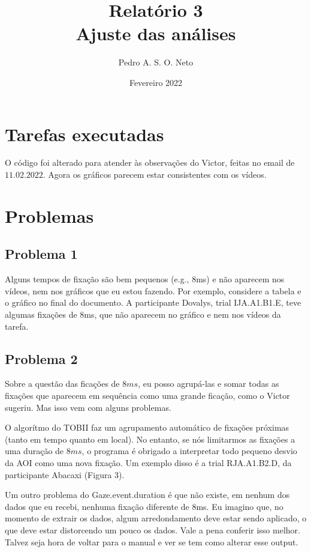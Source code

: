 \documentclass{article}
\title{Relatório 3 \\ Ajuste das análises}
\author{Pedro A. S. O. Neto}
\date{Fevereiro 2022}
\begin{document}
\maketitle

\section{Tarefas executadas}

O código foi alterado para atender às observações do Victor, feitas no email de $11.02.2022$. Agora os gráficos parecem estar consistentes com os vídeos. 

\section{Problemas}

\subsection{Problema 1}
Alguns tempos de fixação são bem pequenos (e.g., 8ms) e não aparecem nos vídeos, nem nos gráficos que eu estou fazendo. Por exemplo, considere a tabela e o gráfico no final do documento. A participante Dovalys, trial IJA.A1.B1.E, teve algumas fixações de 8ms, que não aparecem no gráfico e nem nos vídeos da tarefa.

\subsection{Problema 2}
Sobre a questão das ficações de $8ms$, eu posso agrupá-las e somar todas as fixações que aparecem em sequência como uma grande ficação, como o Victor sugeriu. Mas isso vem com alguns problemas. 


O algorítmo do TOBII faz um agrupamento automático de fixações próximas (tanto em tempo quanto em local). No entanto, se nós limitarmos as fixações a uma duração de $8ms$, o programa é obrigado a interpretar todo pequeno desvio da AOI como uma nova fixação. Um exemplo disso é a trial RJA.A1.B2.D, da participante Abacaxi (Figura 3).

Um outro problema do Gaze.event.duration é que não existe, em nenhum dos dados que eu recebi, nenhuma fixação diferente de 8ms. Eu imagino que, no momento de extrair os dados, algum arredondamento deve estar sendo aplicado, o que deve estar distorcendo um pouco os dados. Vale a pena conferir isso melhor. Talvez seja hora de voltar para o manual e ver se tem como alterar esse output. 
\end{document}
